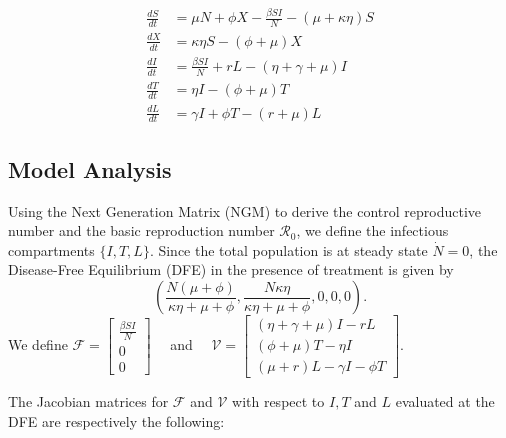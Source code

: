 \documentclass{book}
\begin{document}
$$
\begin{aligned}
\frac{d S}{d t} &=\mu N+\phi X-\frac{\beta S I}{N}-(\mu+\kappa \eta) S \\
\frac{d X}{d t} &=\kappa \eta S-(\phi+\mu) X \\
\frac{d I}{d t} &=\frac{\beta S I}{N}+r L-(\eta+\gamma+\mu) I \\
\frac{d T}{d t} &=\eta I-\left(\phi+\mu\right) T \\
\frac{d L}{d t} &=\gamma I+\phi T-(r+\mu) L
\end{aligned}
$$


\subsection*{Model Analysis}

Using the Next Generation Matrix (NGM) to derive the control reproductive number and the basic reproduction number $\mathcal{R}_0$, we define the infectious compartments $\{I,T,L\}$. Since the total population is at steady state $\dot{N}=0$, the Disease-Free Equilibrium (DFE) in the presence of treatment is given by
$$
\left(\frac{N(\mu+\phi)}{\kappa \eta+\mu+\phi}, \frac{N\kappa \eta}{\kappa \eta+\mu+\phi}, 0,0,0\right).
$$
\noindent We define
$\mathcal{F}=\left[\begin{array}{c}\frac{\beta S I}{N} \\ 0 \\ 0\end{array}\right] \quad$ and $\quad \mathcal{V}=\left[\begin{array}{c}(\eta+\gamma+\mu) I-r L \\ (\phi+\mu) T-\eta I \\ (\mu+r) L-\gamma I-\phi T\end{array}\right]$.

The Jacobian matrices for $\mathcal{F}$ and $\mathcal{V}$ with respect to $I, T$ and $L$ evaluated at the DFE are respectively the following:
\end{document}
